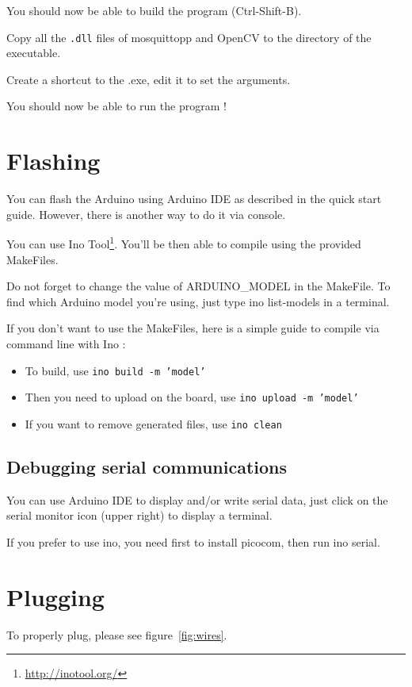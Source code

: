 \documentclass[a4paper,11pt]{report}
\begin{document}
You should now be able to build the program (Ctrl-Shift-B).

Copy all the \texttt{.dll} files of mosquittopp and OpenCV to the directory of
the executable.

Create a shortcut to the .exe, edit it to set the arguments.

You should now be able to run the program !

\section{Flashing}
\label{sec:Flashing} %

You can flash the Arduino using Arduino IDE as described in the quick start
guide. However, there is another way to do it via console.

You can use Ino Tool\footnote{\url{http://inotool.org/}}. You'll be then able
to compile using the provided MakeFiles.

Do not forget to change the value of ARDUINO\_MODEL in the MakeFile. To find
which Arduino model you're using, just type ino list-models in a terminal.

If you don't want to use the MakeFiles, here is a simple guide to compile via
command line with Ino :
\begin{itemize}
    \item To build, use \texttt{ino build -m 'model'}
    \item Then you need to upload on the board, use \texttt{ino upload -m 'model'}
    \item If you want to remove generated files, use \texttt{ino clean}
\end{itemize}

\subsection{Debugging serial communications}

You can use Arduino IDE to display and/or write serial data, just click on the
serial monitor icon (upper right) to display a terminal.

If you prefer to use ino, you need first to install picocom, then run ino
serial.

\section{Plugging}
To properly plug, please see figure~\ref{fig:wires}.
\end{document}
